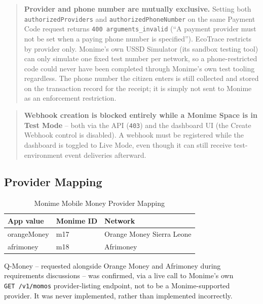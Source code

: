 \begin{quote}
\small
\textbf{Provider and phone number are mutually exclusive.} Setting both
\texttt{authorizedProviders} and \texttt{authorizedPhoneNumber} on the same
Payment Code request returns \texttt{400 arguments\_invalid} (``A payment
provider must not be set when a paying phone number is specified''). EcoTrace
restricts by provider only. Monime's own USSD Simulator (its sandbox testing
tool) can only simulate one fixed test number per network, so a
phone-restricted code could never have been completed through Monime's
own test tooling regardless. The phone number the citizen enters is still
collected and stored on the transaction record for the receipt; it is simply not
sent to Monime as an enforcement restriction.
\end{quote}

\begin{quote}
\small
\textbf{Webhook creation is blocked entirely while a Monime Space is in
Test Mode} -- both via the API (\texttt{403}) and the dashboard UI (the Create
Webhook control is disabled). A webhook must be registered while the
dashboard is toggled to Live Mode, even though it can still receive
test-environment event deliveries afterward.
\end{quote}

\subsection{Provider Mapping}
\begin{table}[H]
\centering
\caption{Monime Mobile Money Provider Mapping}
\label{tab:monime-providers}
\begin{tabular}{@{}p{3cm}p{3cm}p{6.5cm}@{}}
\toprule
\textbf{App value} & \textbf{Monime ID} & \textbf{Network} \\
\midrule
orangeMoney & m17 & Orange Money Sierra Leone \\
afrimoney & m18 & Afrimoney \\
\bottomrule
\end{tabular}
\end{table}

Q-Money -- requested alongside Orange Money and Afrimoney during
requirements discussions -- was confirmed, via a live call to Monime's own
\texttt{GET~/v1/momos} provider-listing endpoint, not to be a Monime-supported
provider. It was never implemented, rather than implemented incorrectly.

